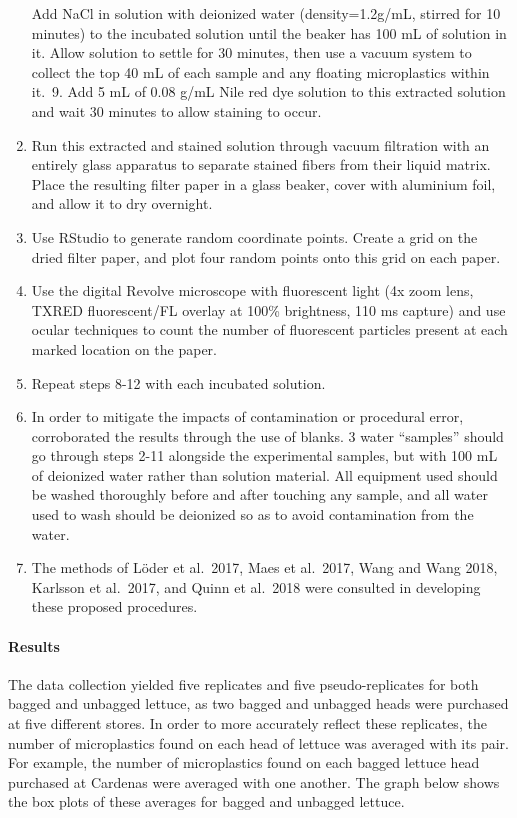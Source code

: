 \documentclass[]{article}
\let\oldparagraph\paragraph
\renewcommand{\paragraph}[1]{\oldparagraph{#1}\mbox{}}
\begin{document}
\begin{enumerate}
  Add NaCl in solution with deionized water (density=1.2g/mL, stirred
  for 10 minutes) to the incubated solution until the beaker has 100 mL
  of solution in it. Allow solution to settle for 30 minutes, then use a
  vacuum system to collect the top 40 mL of each sample and any floating
  microplastics within it.~9. Add 5 mL of 0.08 g/mL Nile red dye
  solution to this extracted solution and wait 30 minutes to allow
  staining to occur.~
\item
  Run this extracted and stained solution through vacuum filtration with
  an entirely glass apparatus to separate stained fibers from their
  liquid matrix. Place the resulting filter paper in a glass beaker,
  cover with aluminium foil, and allow it to dry overnight.~
\item
  Use RStudio to generate random coordinate points. Create a grid on the
  dried filter paper, and plot four random points onto this grid on each
  paper.~
\item
  Use the digital Revolve microscope with fluorescent light (4x zoom
  lens, TXRED fluorescent/FL overlay at 100\% brightness, 110 ms
  capture) and use ocular techniques to count the number of fluorescent
  particles present at each marked location on the paper.~
\item
  Repeat steps 8-12 with each incubated solution.~
\item
  In order to mitigate the impacts of contamination or procedural error,
  corroborated the results through the use of blanks. 3 water
  ``samples'' should go through steps 2-11 alongside the experimental
  samples, but with 100 mL of deionized water rather than solution
  material. All equipment used should be washed thoroughly before and
  after touching any sample, and all water used to wash should be
  deionized so as to avoid contamination from the water.~
\item
  The methods of Löder et al.~2017, Maes et al.~2017, Wang and Wang
  2018, Karlsson et al.~2017, and Quinn et al.~2018 were consulted in
  developing these proposed procedures.
\end{enumerate}

\hypertarget{results}{%
\paragraph{Results}\label{results}}

The data collection yielded five replicates and five pseudo-replicates
for both bagged and unbagged lettuce, as two bagged and unbagged heads
were purchased at five different stores. In order to more accurately
reflect these replicates, the number of microplastics found on each head
of lettuce was averaged with its pair. For example, the number of
microplastics found on each bagged lettuce head purchased at Cardenas
were averaged with one another. The graph below shows the box plots of
these averages for bagged and unbagged lettuce.
\end{document}
